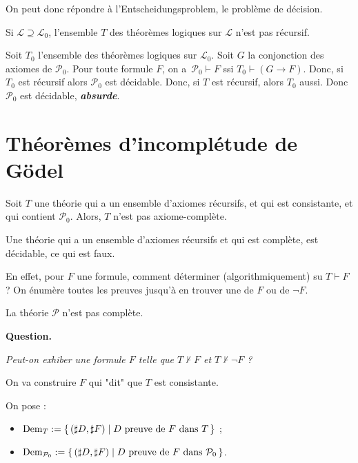 \documentclass[./main]{subfiles}
\begin{document}
 On peut donc répondre à l'Entscheidungsproblem, le problème de décision.

 \begin{thm}
   Si $\mathcal{L} \supseteq \mathcal{L}_0$, l'ensemble $T$ des théorèmes logiques sur $\mathcal{L}$ n'est pas récursif.
 \end{thm}
 \begin{prv}
   Soit $T_0$ l'ensemble des théorèmes logiques sur $\mathcal{L}_0$.
   Soit $G$ la conjonction des axiomes de $\mathcal{P}_0$.
   Pour toute formule $F$, on a~$\mathcal{P}_0 \vdash F$ ssi $T_0 \vdash (G \to F)$.
   Donc, si $T_0$ est récursif alors $\mathcal{P}_0$ est décidable.
   Donc, si $T$ est récursif, alors $T_0$ aussi.
   Donc $\mathcal{P}_0$ est décidable, \textit{\textbf{absurde}}.
 \end{prv}

 \section{Théorèmes d'incomplétude de Gödel}

 \begin{thm}
   Soit $T$ une théorie qui a un ensemble d'axiomes récursifs, et qui est consistante, et qui contient $\mathcal{P}_0$. Alors, $T$ n'est pas axiome-complète.
 \end{thm}
 \begin{prv}
   Une théorie qui a un ensemble d'axiomes récursifs et qui est complète, est décidable, ce qui est faux.

   En effet, pour $F$ une formule, comment déterminer (algorithmiquement) su $T \vdash F$ ?
   On énumère toutes les preuves jusqu'à en trouver une de $F$ ou de $\lnot F$.
 \end{prv}

 \begin{crlr}
   La théorie $\mathcal{P}$ n'est pas complète.
 \end{crlr}


 \textbf{Question.} 
 \begin{center}
   \textit{Peut-on exhiber une formule $F$ telle que $T \not\vdash F$ et $T \not\vdash \lnot F$ ?}
 \end{center}

 On va construire $F$ qui "dit" que $T$ est consistante.

 \begin{defn}
   On pose :
   \begin{itemize}
     \item $\mathrm{Dem}_T := \mleft\{\,(\sharp D, \sharp F) \;\middle|\; \text{$D$ preuve de $F$ dans $T$}\,\mright\}$ ;
     \item $\mathrm{Dem}_{\mathcal{P}_0} := \mleft\{\,(\sharp D, \sharp F) \;\middle|\; \text{$D$ preuve de $F$ dans $\mathcal{P}_0$}\,\mright\}$.
   \end{itemize}
 \end{defn}
\end{document}
